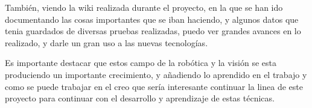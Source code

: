 \hspace{1cm} Tambi\'en, viendo la wiki realizada durante el proyecto, en la que se han ido documentando las cosas importantes que se iban haciendo, y algunos datos que tenia guardados de diversas pruebas realizadas, puedo ver grandes avances en lo realizado, y darle un gran uso a las nuevas tecnolog\'ias.

\hspace{1cm} Es importante destacar que estos campo de la rob\'otica y la visi\'on se esta produciendo un importante crecimiento, y añadiendo lo aprendido en el trabajo y como se puede trabajar en el creo que ser\'ia interesante continuar la linea de este proyecto para continuar con el desarrollo y aprendizaje de estas t\'ecnicas. 




